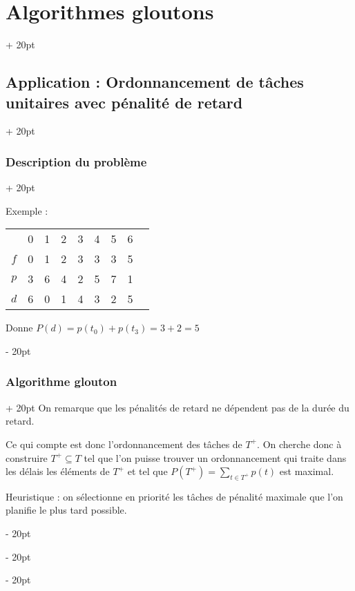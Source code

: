 \documentclass[a4paper, 12pt, twoside]{article}
\newcommand{\ind}[1][20pt]{\advance\leftskip + #1}
\newcommand{\deind}[1][20pt]{\advance\leftskip - #1}
\newenvironment{indt}[2][20pt]{#2 \par \ind[#1]}{\par \deind} %
\begin{document}
\begin{indt}{\section{Algorithmes gloutons}}
\begin{indt}{\subsection{Application : Ordonnancement de tâches unitaires avec pénalité de retard}}
\begin{indt}{\subsubsection{Description du problème}}
                \vspace{12pt}
                
                Exemple :
                
                \begin{center}
                    \begin{tabular}{|c!{\vline width 2pt}c|c|c|c|c|c|c|c|}
                        \hline
                        & 0 & 1 & 2 & 3 & 4 & 5 & 6
                        \\
                        $f$ & 0 & 1 & 2 & 3 & 3 & 3 & 5
                        \\
                        \hline
                        $p$ & 3 & 6 & 4 & 2 & 5 & 7 & 1
                        \\
                        \hline
                        $d$ & 6 & 0 & 1 & 4 & 3 & 2 & 5
                        \\
                        \hline
                    \end{tabular}
                \end{center}
                
                Donne $P(d) = p(t_0) + p(t_3) = 3 + 2 = 5$
            \end{indt}
            
            \vspace{12pt}
            
            \begin{indt}{\subsubsection{Algorithme glouton}}
                On remarque que les pénalités de retard ne dépendent pas de la durée du retard.
                
                Ce qui compte est donc l'ordonnancement des tâches de $T^+$. On cherche donc à construire $T^+ \subseteq T$ tel que l'on puisse trouver un ordonnancement qui traite dans les délais les éléments de $T^+$ et tel que $P(T^+) = \displaystyle \sum_{t \in T^+} p(t)$ est maximal.
                
                Heuristique : on sélectionne en priorité les tâches de pénalité maximale que l'on planifie le plus tard possible.
                
                \vspace{12pt}
                

\end{indt}
\end{indt}
\end{indt}
\end{document}
